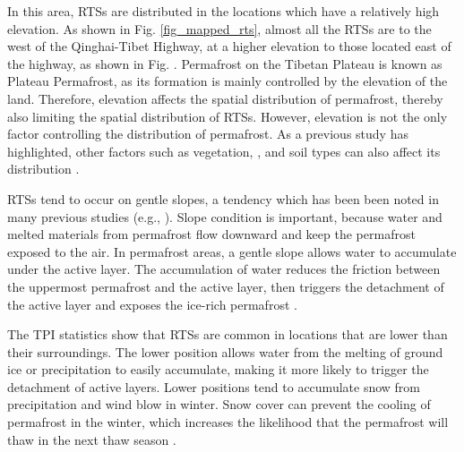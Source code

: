 \documentclass[authoryear,preprint,review,12pt]{elsarticle}
\begin{document}




In this area, RTSs are distributed in the locations which have a relatively high elevation.
As shown in Fig. \ref{fig_mapped_rts}, almost all the RTSs are to the west of the Qinghai-Tibet Highway, at a higher elevation to those located east of the highway, as shown in Fig. . Permafrost on the Tibetan Plateau is known as Plateau Permafrost, as its formation is mainly controlled by the elevation of the land. Therefore, elevation affects the spatial distribution of permafrost, thereby also limiting the spatial distribution of RTSs. However, elevation is not the only factor controlling the distribution of permafrost. As a previous study has highlighted, other factors such as vegetation, , and soil types can also affect its distribution \citep{yin2017effects}.

RTSs tend to occur on gentle slopes, a tendency which has been been noted in many previous studies (e.g., \citealp{leibman1995cryogenic, niu2014thaw, lacelle_distribution_2015}). Slope condition is important, because water and melted materials from permafrost flow downward and keep the permafrost exposed to the air. In permafrost areas, a gentle slope allows water to accumulate under the active layer. The accumulation of water reduces the friction between the uppermost permafrost and the active layer,  then triggers the detachment of the active layer and exposes the ice-rich permafrost \citep{mcroberts1974stability, mcroberts1974the}. 

The TPI statistics show that RTSs are common in locations that are lower than their surroundings. The lower position allows water from the melting of ground ice or precipitation to easily accumulate, making it more likely to trigger the detachment of active layers. Lower positions tend to accumulate snow from precipitation and wind blow in winter. Snow cover can prevent the cooling of permafrost in the winter, which increases the likelihood that the permafrost will thaw in the next thaw season . 
\end{document}
